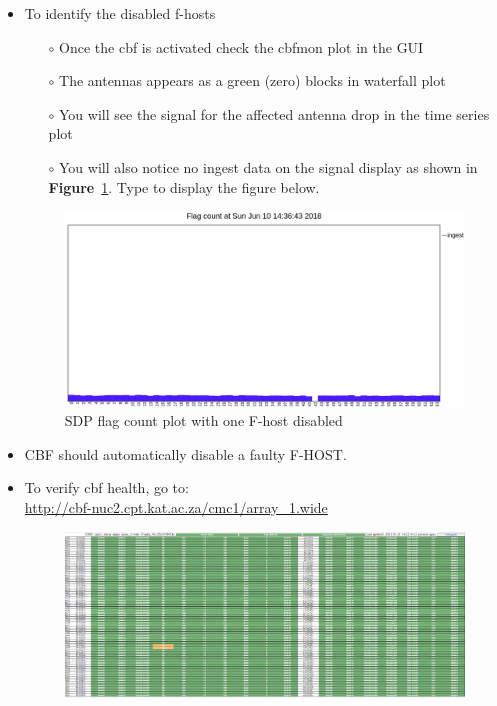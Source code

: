 \begin{itemize}
	\item {}To identify the disabled f-hosts
	
	\begin{itemize}
		\item[$\circ$] Once the cbf is activated check the cbfmon plot in the GUI
		\item[$\circ$] The antennas appears as a green (zero) blocks in waterfall plot
		\item[$\circ$] You will see the signal for the affected antenna drop in the time series plot
		\item[$\circ$] You will also notice no ingest data on the signal display as shown in \textbf{Figure}~\ref{fig:image20}.   Type  to display the figure below.
		
		
	\end{itemize}



 

\begin{figure}[!thb]
	\centering
	\includegraphics[scale=0.4]{Chapters/images/image20.png}
	
	\caption{SDP flag count plot with one F-host disabled}
	\label{fig:image20}
\end{figure}

\item{} CBF should automatically disable a faulty F-HOST.
\item{} To verify cbf health, go to:\\ \url{http://cbf-nuc2.cpt.kat.ac.za/cmc1/array_1.wide}

\begin{figure}[!thb]
	\centering
	\includegraphics[scale=0.22]{Chapters/images/image40.png}
	

\end{figure}
\end{itemize}

